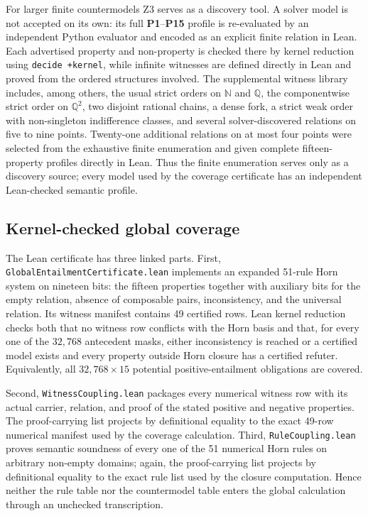 \documentclass[11pt,a4paper,reqno]{amsart}
\theoremstyle{definition}
\theoremstyle{remark}
\newcommand{\prop}[1]{\textbf{P#1}}
\begin{document}
For larger finite countermodels Z3 serves as a discovery tool.  A solver model
is not accepted on its own: its full \prop{1}--\prop{15} profile is
re-evaluated by an independent Python evaluator and encoded as an explicit
finite relation in Lean.  Each advertised property and non-property is checked
there by kernel reduction using \texttt{decide +kernel}, while infinite
witnesses are defined directly in Lean and proved from the ordered structures
involved.  The supplemental witness library includes, among others, the usual
strict orders on $\mathbb{N}$ and $\mathbb{Q}$, the componentwise strict order
on $\mathbb{Q}^2$, two disjoint rational chains, a dense fork, a strict weak
order with non-singleton indifference classes, and several solver-discovered
relations on five to nine points.  Twenty-one additional relations on at most
four points were selected from the exhaustive finite enumeration and given
complete fifteen-property profiles directly in Lean.  Thus the finite enumeration serves only as a discovery source; every model
used by the coverage certificate has an independent Lean-checked semantic
profile.

\subsection{Kernel-checked global coverage}\label{subsec:kernel-coverage}

The Lean certificate has three linked parts.  First,
\texttt{GlobalEntailmentCertificate.lean} implements an expanded 51-rule Horn
system on nineteen bits: the fifteen properties together with auxiliary bits
for the empty relation, absence of composable pairs, inconsistency, and the
universal relation.  Its witness manifest contains 49 certified rows.  Lean
kernel reduction checks both that no witness row conflicts with the Horn basis
and that, for every one of the $32{,}768$ antecedent masks, either inconsistency
is reached or a certified model exists and every property outside Horn closure
has a certified refuter.  Equivalently, all $32{,}768\times 15$ potential
positive-entailment obligations are covered.

Second, \texttt{WitnessCoupling.lean} packages every numerical witness row with
its actual carrier, relation, and proof of the stated positive and negative
properties.  The proof-carrying list projects by definitional equality to the
exact 49-row numerical manifest used by the coverage calculation.  Third,
\texttt{RuleCoupling.lean} proves semantic soundness of every one of the 51
numerical Horn rules on arbitrary non-empty domains; again, the proof-carrying
list projects by definitional equality to the exact rule list used by the
closure computation.  Hence neither the rule table nor the countermodel table
enters the global calculation through an unchecked transcription.
\end{document}

